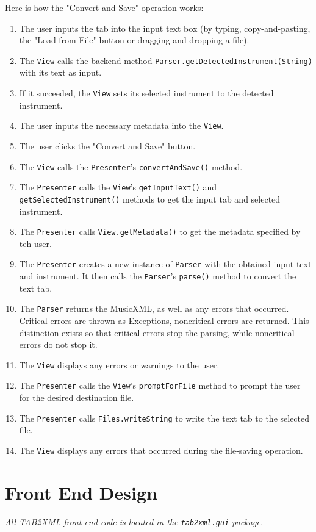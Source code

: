 \documentclass[11pt]{article}
\begin{document}
Here is how the "Convert and Save" operation works:
\begin{enumerate}
\item The user inputs the tab into the input text box (by typing, copy-and-pasting, the "Load from File" button or dragging and dropping a file).
\item The \texttt{View} calls the backend method \texttt{Parser.getDetectedInstrument(String)} with its text as input.
\item If it succeeded, the \texttt{View} sets its selected instrument to the detected instrument.
\item The user inputs the necessary metadata into the \texttt{View}.
\item The user clicks the "Convert and Save" button.
\item The \texttt{View} calls the \texttt{Presenter}'s \texttt{convertAndSave()} method.
\item The \texttt{Presenter} calls the \texttt{View}'s \texttt{getInputText()} and \texttt{getSelectedInstrument()} methods to get the input tab and selected instrument.
\item The \texttt{Presenter} calls \texttt{View.getMetadata()} to get the metadata specified by teh user.
\item The \texttt{Presenter} creates a new instance of \texttt{Parser} with the obtained input text and instrument.  It then calls the \texttt{Parser}'s \texttt{parse()} method to convert the text tab.
\item The \texttt{Parser} returns the MusicXML, as well as any errors that occurred.  Critical errors are thrown as Exceptions, noncritical errors are returned.  This distinction exists so that critical errors stop the parsing, while noncritical errors do not stop it.
\item The \texttt{View} displays any errors or warnings to the user.
\item The \texttt{Presenter} calls the \texttt{View}'s \texttt{promptForFile} method to prompt the user for the desired destination file.
\item The \texttt{Presenter} calls \texttt{Files.writeString} to write the text tab to the selected file.
\item The \texttt{View} displays any errors that occurred during the file-saving operation.
\end{enumerate}
\newpage

\section{Front End Design}
\label{sec:orgce08d1f}
\emph{All TAB2XML front-end code is located in the \texttt{tab2xml.gui} package.}
\end{document}
